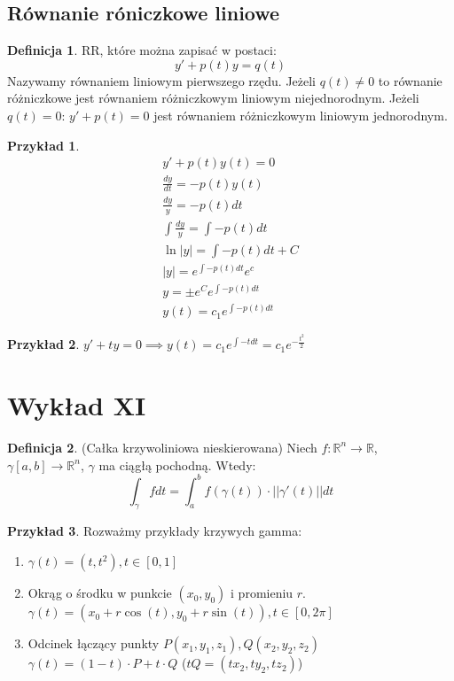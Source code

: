 \documentclass{article}
\theoremstyle{definition}
\newtheorem{de}{Definicja}[subsection]
\theoremstyle{definition}
\theoremstyle{definition}
\newtheorem{pk}{Przykład}[subsection]
\theoremstyle{definition}
\theoremstyle{definition}
\theoremstyle{definition}
\theoremstyle{definition}
\begin{document}
\subsection{Równanie róniczkowe liniowe}

\begin{de}
    RR, które można zapisać w postaci:
    \[y' + p(t)y = q(t)\]
    Nazywamy równaniem liniowym pierwszego rzędu.
    Jeżeli $q(t)\neq 0$ to równanie różniczkowe jest równaniem różniczkowym liniowym niejednorodnym.
    Jeżeli $q(t)=0$: $y'+p(t)=0$ jest równaniem różniczkowym liniowym jednorodnym.
\end{de}

\begin{pk}
    \begin{align}
        y' + p(t)y(t) = 0\\
        \frac{dy}{dt} = -p(t)y(t)\\
        \frac{dy}{y} = -p(t)dt\\
        \int \frac{dy}{y} = \int -p(t) dt\\
        \ln|y| = \int -p(t) dt + C\\
        |y| = e^{\int -p(t) dt} e^{c}\\
        y=\pm e^C e^{\int -p(t) dt}\\
        y(t) = c_1 e^{\int -p(t) dt} 
    \end{align}
\end{pk}

\begin{pk}
    $y' + ty = 0 \implies y(t) = c_1 e^{\int -t dt} = c_1 e^{-\frac{t^2}{2}}$
\end{pk}

\section{Wykład XI}

\begin{de}
    (Całka krzywoliniowa nieskierowana) Niech \( f:\mathbb{R}^n \rightarrow \mathbb{R} \), \( \gamma [a,b]\rightarrow\mathbb{R}^n\), $\gamma$ ma ciągłą pochodną.
    Wtedy:
    \[ \int_{\gamma} f dt = \int_{a}^{b} f(\gamma(t)) \cdot ||\gamma'(t)|| dt \]
\end{de}

\begin{pk}
    Rozważmy przykłady krzywych gamma:
    \begin{enumerate}
        \item \( \gamma (t) = (t,t^2), t\in[0,1] \)
        \item Okrąg o środku w punkcie $(x_0,y_0)$ i promieniu $r$. \( \gamma(t) = (x_0 + r\cos(t), y_0 + r\sin(t)), t \in [0,2\pi]\)
        \item Odcinek łączący punkty $P(x_1,y_1,z_1), Q(x_2,y_2,z_2)$ \( \gamma(t) = (1-t)\cdot P + t\cdot Q\) ($tQ = (tx_2, ty_2, tz_2)$)
    \end{enumerate}
\end{pk}
\end{document}
